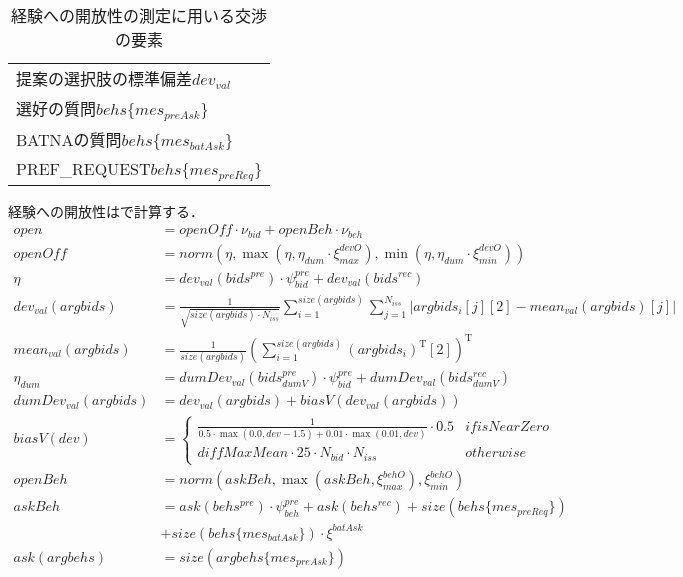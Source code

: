 \begin{table}[tb]
    \centering
    \caption{経験への開放性の測定に用いる交渉の要素}
    \begin{tabular}{l} \toprule
        提案の選択肢の標準偏差$dev_{val}$ \\
        選好の質問$behs\{mes_{\mathit{preAsk}}\}$  \\
        BATNAの質問$behs\{mes_{\mathit{batAsk}}\}$ \\
        PREF\_REQUEST$behs\{mes_{\mathit{preReq}}\}$ \\ \bottomrule
    \end{tabular}
    \label{tab:openness}
\end{table}

経験への開放性はで計算する．
\begin{align}
    open &= \mathit{openOff} \cdot \nu_{\mathit{bid}} + openBeh \cdot \nu_{beh} \label{eq:openness} \\
    \mathit{openOff} &= norm \left(\eta, \max \left(\eta, \eta_{dum} \cdot \xi_{max}^{devO}\right), \min \left(\eta, \eta_{dum} \cdot \xi_{min}^{devO}\right) \right) \nonumber \\
    \eta &= dev_{val}(bids^{pre}) \cdot \psi_{\mathit{bid}}^{pre} + dev_{val}(bids^{rec}) \nonumber \\
    dev_{val}(argbids) &= \frac{1}{\sqrt{size(argbids) \cdot N_{iss}}}\sum_{i = 1}^{size(argbids)} \sum_{j = 1}^{N_{iss}} \left| argbids_i[j][2] - mean_{val}(argbids)[j] \right| \nonumber \\
    mean_{val}(argbids) &= \frac{1}{size(argbids)}\left(\sum_{i = 1}^{size(argbids)} (argbids_i)^{\mathrm{T}}[2] \right)^{\mathrm{T}} \nonumber \\
    \eta_{dum} &= dumDev_{val}(bids_{dumV}^{pre}) \cdot \psi_{\mathit{bid}}^{pre} + dumDev_{val}(bids_{dumV}^{rec}) \nonumber \\
    dumDev_{val}(argbids) &= dev_{val}(argbids) + biasV(dev_{val}(argbids)) \nonumber \\
    biasV(dev) &= 
    \begin{cases*}
        \frac{1}{0.5 \cdot \max (0.0, dev - 1.5) + 0.01 \cdot \max (0.01, dev)} \cdot 0.5 & if isNearZero \\
        \mathit{diffMaxMean} \cdot 25 \cdot N_{bid} \cdot N_{iss} & otherwise 
    \end{cases*} \nonumber \\
    openBeh &= norm\left( askBeh, \max \left( askBeh, \xi_{max}^{\mathit{behO}}\right), \xi_{min}^{\mathit{behO}} \right) \nonumber \\
    askBeh &=  ask(behs^{pre}) \cdot \psi_{beh}^{pre} + ask(behs^{rec}) + size(behs\{mes_{\mathit{preReq}}\}) \nonumber \\
    &+ size(behs\{mes_{\mathit{batAsk}}\}) \cdot \xi^{batAsk} \nonumber \\
    ask(argbehs) &= size(argbehs\{mes_{\mathit{preAsk}}\}) \nonumber
\end{align}

